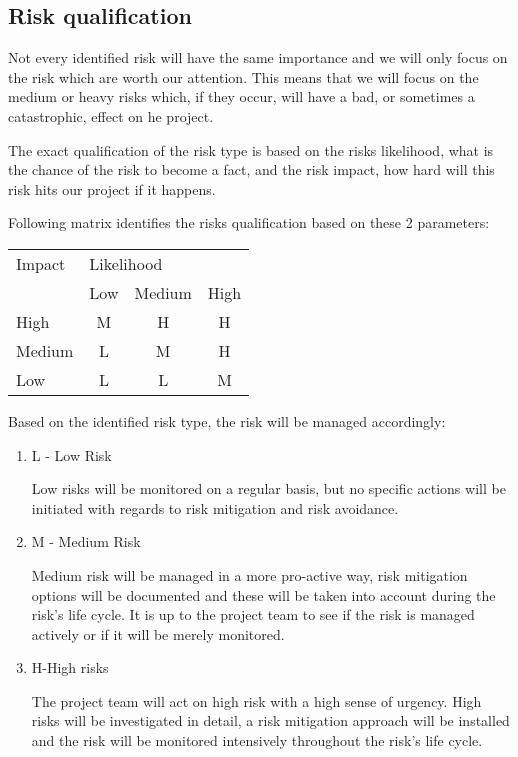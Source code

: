 \subsection{Risk qualification }
Not every identified risk will have the same importance and we will only focus on the risk which are worth our attention.
This means that we will focus on the medium or heavy risks which, if they occur, will have a bad, or sometimes a catastrophic, effect on he project.

The exact qualification of the risk type is based on the risks likelihood, what is the chance of the risk to become a fact, and the risk impact, how hard will this risk hits our project if it happens.

Following matrix identifies the risks qualification based on these 2 parameters:


\begin{table}[h]
\centering
\begin{tabular}{lccc}
Impact & \multicolumn{3}{l}{Likelihood}                                                     \\
       & \multicolumn{1}{l}{Low}   & \multicolumn{1}{l}{Medium} & \multicolumn{1}{l}{High}  \\
High   & \cellcolor[HTML]{FFCB2F}M & \cellcolor[HTML]{FE0000}H  & \cellcolor[HTML]{FE0000}H \\
Medium & \cellcolor[HTML]{34FF34}L & \cellcolor[HTML]{FFCB2F}M  & \cellcolor[HTML]{FE0000}H \\
Low    & \cellcolor[HTML]{34FF34}L & \cellcolor[HTML]{34FF34}L  & \cellcolor[HTML]{FFC702}M
\end{tabular}
\end{table}

Based on the identified risk type, the risk will be managed accordingly:
\begin{enumerate}
	\item L - Low Risk

	Low risks will be monitored on a regular basis, but no specific actions will be initiated with regards to risk mitigation and risk avoidance.
	\item M - Medium Risk

	Medium risk will be managed in a more pro-active way, risk mitigation options will be documented and these will be taken into account during the risk's life cycle. It is up to the project team to see if the risk is managed actively or if it will be merely monitored.
	\item H-High risks

	The project team will act on high risk with a high sense of urgency. High risks will be investigated in detail, a risk mitigation approach will be installed and the risk will be monitored intensively throughout the risk's life cycle.
\end {enumerate}
 


